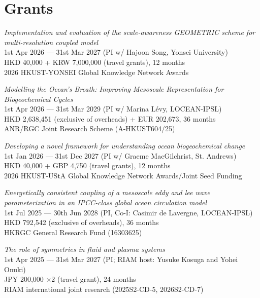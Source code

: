 \documentclass[letterpaper]{article}
\renewenvironment{itemize}{
  \begin{list}{}{
    \setlength{\leftmargin}{1.5em}
  }
}{
  \end{list}
}
\begin{document}
\section*{Grants}

\begin{itemize}

\item[--] \textit{Implementation and evaluation of the scale-awareness GEOMETRIC scheme for multi-resolution coupled model}\\
1st Apr 2026 --- 31st Mar 2027 (PI w/ Hajoon Song, Yonsei University)\\
HKD 40,000 + KRW 7,000,000 (travel grants), 12 months\\
2026 HKUST-YONSEI Global Knowledge Network Awards

\item[--] \textit{Modelling the Ocean's Breath: Improving Mesoscale Representation for Biogeochemical Cycles}\\
1st Apr 2026 --- 31st Mar 2029 (PI w/ Marina L\'evy, LOCEAN-IPSL)\\
HKD 2,638,451 (exclusive of overheads) + EUR 202,673, 36 months\\
ANR/RGC Joint Research Scheme (A-HKUST604/25)

\item[--] \textit{Developing a novel framework for understanding ocean biogeochemical change}\\
1st Jan 2026 --- 31st Dec 2027 (PI w/ Graeme MacGilchrist, St. Andrews)\\
HKD 40,000 + GBP 4,750 (travel grants), 12 months\\
2026 HKUST-UStA Global Knowledge Network Awards/Joint Seed Funding

\item[--] \textit{Energetically consistent coupling of a mesoscale eddy and lee wave parameterization in an IPCC-class global ocean circulation model}\\
1st Jul 2025 --- 30th Jun 2028 (PI, Co-I: Casimir de Lavergne, LOCEAN-IPSL)\\
HKD 792,542 (exclusive of overheads), 36 months\\
HKRGC General Research Fund (16303625)

\item[--] \textit{The role of symmetries in fluid and plasma systems}\\
1st Apr 2025 --- 31st Mar 2027 (PI; RIAM host: Yusuke Kosuga and Yohei Onuki)\\
JPY 200,000 $\times 2$ (travel grant), 24 months\\
RIAM international joint research (2025S2-CD-5, 2026S2-CD-7)


\end{itemize}
\end{document}
